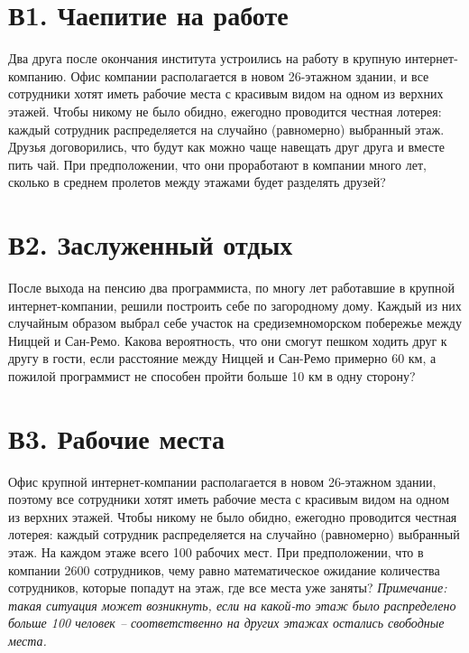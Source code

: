 \documentclass[11pt]{article}
\begin{document}
\section*{В1. Чаепитие на работе}

Два друга после окончания института устроились на работу в крупную интернет-компанию. Офис компании располагается в новом 26-этажном здании, и все сотрудники хотят иметь рабочие места с красивым видом на одном из верхних этажей. Чтобы никому не было обидно, ежегодно проводится честная лотерея: каждый сотрудник распределяется на случайно (равномерно) выбранный этаж. Друзья договорились, что будут как можно чаще навещать друг друга и вместе пить чай. При предположении, что они проработают в компании много лет, сколько в среднем пролетов между этажами будет разделять друзей?

\section*{В2. Заслуженный отдых}

После выхода на пенсию два программиста, по многу лет работавшие в крупной интернет-компании, решили построить себе по загородному дому. Каждый из них случайным образом выбрал себе участок на средиземноморском побережье между Ниццей и Сан-Ремо. Какова вероятность, что они смогут пешком ходить друг к другу в гости, если расстояние между Ниццей и Сан-Ремо примерно 60 км, а пожилой программист не способен пройти больше 10 км в одну сторону?

\section*{В3. Рабочие места}

Офис крупной интернет-компании располагается в новом 26-этажном здании, поэтому все сотрудники хотят иметь рабочие места с красивым видом на одном из верхних этажей. Чтобы никому не было обидно, ежегодно проводится честная лотерея: каждый сотрудник распределяется на случайно (равномерно) выбранный этаж. На каждом этаже всего 100 рабочих мест. При предположении, что в компании 2600 сотрудников, чему равно математическое ожидание количества сотрудников, которые попадут на этаж, где все места уже заняты? {\it Примечание: такая ситуация может возникнуть, если на какой-то этаж было распределено больше 100 человек -- соответственно на других этажах остались свободные места.}
\end{document}
